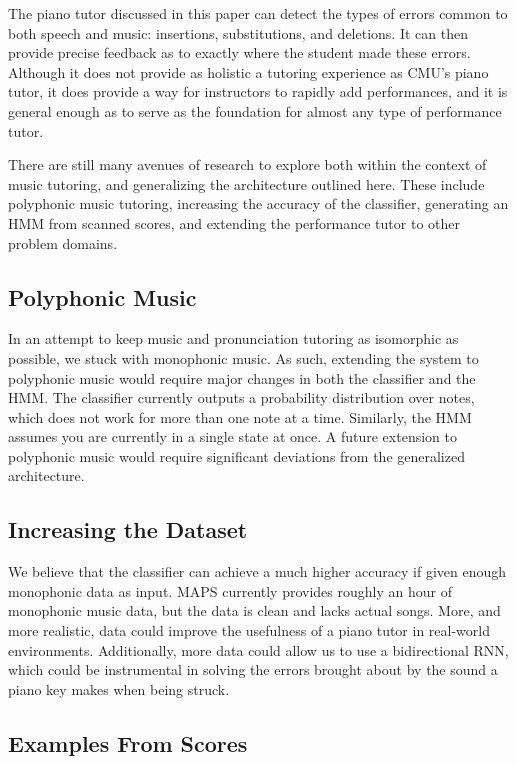 \documentclass[twocolumn]{article}
\begin{document}
The piano tutor discussed in this paper can detect the types of errors common to both speech and music: insertions, substitutions, and deletions. It can then provide precise feedback as to exactly where the student made these errors. Although it does not provide as holistic a tutoring experience as CMU’s piano tutor, it does provide a way for instructors to rapidly add performances, and it is general enough as to serve as the foundation for almost any type of performance tutor.

There are still many avenues of research to explore both within the context of music tutoring, and generalizing the architecture outlined here. These include polyphonic music tutoring, increasing the accuracy of the classifier, generating an HMM from scanned scores, and extending the performance tutor to other problem domains.

\subsection{Polyphonic Music}

In an attempt to keep music and pronunciation tutoring as isomorphic as possible, we stuck with monophonic music. As such, extending the system to polyphonic music would require major changes in both the classifier and the HMM. The classifier currently outputs a probability distribution over notes, which does not work for more than one note at a time. Similarly, the HMM assumes you are currently in a single state at once. A future extension to polyphonic music would require significant deviations from the generalized architecture.

\subsection{Increasing the Dataset}

We believe that the classifier can achieve a much higher accuracy if given enough monophonic data as input. MAPS currently provides roughly an hour of monophonic music data, but the data is clean and lacks actual songs. More, and more realistic, data could improve the usefulness of a piano tutor in real-world environments. Additionally, more data could allow us to use a bidirectional RNN, which could be instrumental in solving the errors brought about by the sound a piano key makes when being struck.

\subsection{Examples From Scores}
\end{document}
